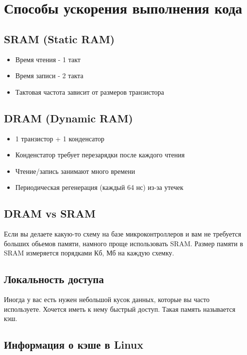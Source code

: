 \section{Способы ускорения выполнения кода}

\subsection{SRAM (Static RAM)}

\begin{itemize}
	\item Время чтения - 1 такт
	\item Время записи - 2 такта
	\item Тактовая частота зависит от размеров транзистора
\end{itemize}

\subsection{DRAM (Dynamic RAM)}

\begin{itemize}
	\item 1 транзистор + 1 конденсатор
	\item Конденстатор требует перезарядки после каждого чтения
	\item Чтение/запись занимают много времени
	\item Периодическая регенерация (каждый 64 нс) из-за утечек
\end{itemize}

\subsection{DRAM vs SRAM}

Если вы делаете какую-то схему на базе микроконтроллеров и вам не требуется больших
обьемов памяти, намного проще использовать SRAM. Размер памяти в SRAM измеряется порядками
Кб, Мб на каждую схемку.

\subsection{Локальность доступа}

Иногда у вас есть нужен небольшой кусок данных, которые вы часто используете. Хочется 
иметь к нему быстрый доступ. Такая память называется кэш.

\subsection{Информация о кэше в Linux}

